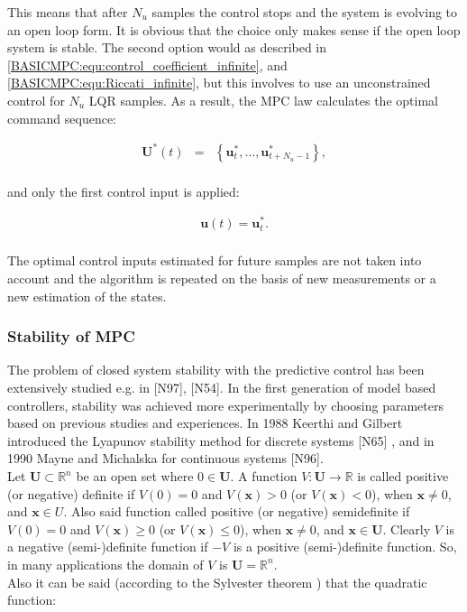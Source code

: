 		This means that after $N_u$ samples the control stops and the system is evolving to an open loop form. It is obvious that the choice only makes sense if the open loop system is stable. The second option would as described in \ref{BASICMPC:equ:control_coefficient_infinite}, and \ref{BASICMPC:equ:Riccati_infinite}, but this involves to use an unconstrained control for $N_u$ LQR samples. As a result, the MPC law calculates the optimal command sequence:
		
		\begin{equation}
        \begin{array}{rcl}
				\textbf{U}^*(t)&=&\left\{\textbf{u}^*_t,\dots,\textbf{u}^*_{t+N_u-1}\right\},\\
        \end{array}
        \label{BASICMPC:equ:receiding_optimal_sequence}
    \end{equation}
		
		and only the first control input is applied:
		
		\begin{equation}
        \begin{array}{rcl}
				\textbf{u}(t)=\textbf{u}^*_t.\\
        \end{array}
        \label{BASICMPC:equ:receiding_optimal_first}
    \end{equation}
		
		The optimal control inputs estimated for future samples are not taken into account and the algorithm is
repeated on the basis of new measurements or a new estimation of the states.

\subsubsection{Stability of MPC}\label{BASICCSR:sec:MPCStability}		

	The problem of closed system stability with the predictive control has been extensively studied e.g. in [N97], [N54]. In the first generation of model based controllers, stability was achieved more experimentally by choosing parameters based on previous studies and experiences. In 1988 Keerthi and Gilbert introduced the Lyapunov stability method for discrete systems [N65] , and in 1990 Mayne and Michalska for continuous systems [N96]. \\
	Let $\textbf{U}\subset\mathbb{R}^n$ be an open set where $0\in \textbf{U}$. A function $V:\textbf{U}\longrightarrow\mathbb{R}$ is called positive (or negative) definite if $V(0)=0$ and $V(\boldsymbol{x})>0$ (or $V(\boldsymbol{x})<0$), when $\boldsymbol{x}\neq0$, and $\boldsymbol{x}\in U$. Also said function called positive (or negative) semidefinite if $V(0)=0$ and $V(\boldsymbol{x})\geq 0$ (or $V(\boldsymbol{x})\leq 0$), when $\boldsymbol{x}\neq 0$, and $\boldsymbol{x}\in \textbf{U}$. Clearly $V$ is a negative (semi-)definite function if $-V$ is a positive (semi-)definite function. So, in many applications the domain of $V$ is $\textbf{U}=\mathbb{R}^n$.\\
	Also it can be said (according to the Sylvester theorem \cite{horn2012matrix}) that the quadratic function:
	
